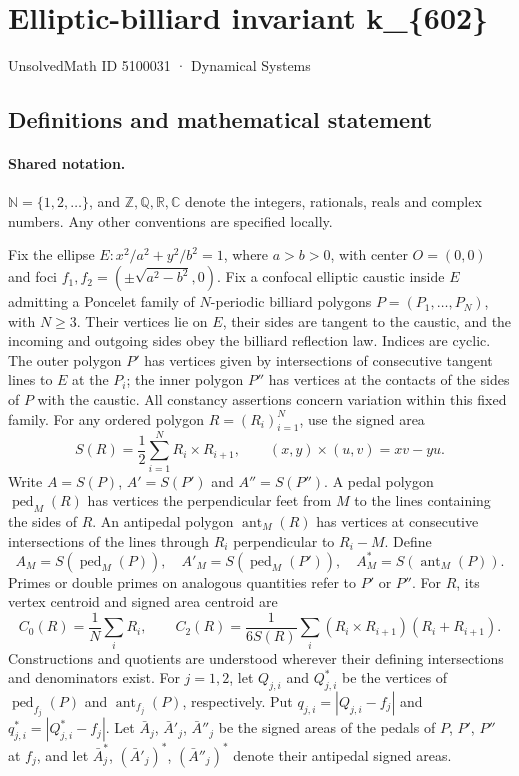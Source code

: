 \documentclass[11pt]{article}
\begin{document}
\setcounter{section}{5100030}
\section{Elliptic-billiard invariant k\_\{602\}}\label{5100031}
{\small\sffamily UnsolvedMath ID 5100031 · Dynamical Systems}
\subsection{Definitions and mathematical statement}

\paragraph{Shared notation.}$\mathbb N=\{1,2,\ldots\}$, and $\mathbb Z,\mathbb Q,\mathbb R,\mathbb C$ denote the integers, rationals, reals and complex numbers. Any other conventions are specified locally.


Fix the ellipse $E:x^2/a^2+y^2/b^2=1$, where $a>b>0$, with center $O=(0,0)$ and foci $f_1,f_2=(\pm\sqrt{a^2-b^2},0)$. Fix a confocal elliptic caustic inside $E$ admitting a Poncelet family of $N$-periodic billiard polygons $P=(P_1,\ldots,P_N)$, with $N\geq3$. Their vertices lie on $E$, their sides are tangent to the caustic, and the incoming and outgoing sides obey the billiard reflection law. Indices are cyclic. The outer polygon $P'$ has vertices given by intersections of consecutive tangent lines to $E$ at the $P_i$; the inner polygon $P''$ has vertices at the contacts of the sides of $P$ with the caustic. All constancy assertions concern variation within this fixed family.
For any ordered polygon $R=(R_i)_{i=1}^N$, use the signed area
\[S(R)=\frac12\sum_{i=1}^N R_i\times R_{i+1},\qquad (x,y)\times(u,v)=xv-yu.\]
Write $A=S(P)$, $A'=S(P')$ and $A''=S(P'')$. A pedal polygon $\operatorname{ped}_M(R)$ has vertices the perpendicular feet from $M$ to the lines containing the sides of $R$. An antipedal polygon $\operatorname{ant}_M(R)$ has vertices at consecutive intersections of the lines through $R_i$ perpendicular to $R_i-M$. Define
\[A_M=S(\operatorname{ped}_M(P)),\quad A'_M=S(\operatorname{ped}_M(P')),\quad A_M^*=S(\operatorname{ant}_M(P)).\]
Primes or double primes on analogous quantities refer to $P'$ or $P''$. For $R$, its vertex centroid and signed area centroid are
\[C_0(R)=\frac1N\sum_i R_i,\qquad C_2(R)=\frac{1}{6S(R)}\sum_i(R_i\times R_{i+1})(R_i+R_{i+1}).\]
Constructions and quotients are understood wherever their defining intersections and denominators exist.
For $j=1,2$, let $Q_{j,i}$ and $Q^*_{j,i}$ be the vertices of $\operatorname{ped}_{f_j}(P)$ and $\operatorname{ant}_{f_j}(P)$, respectively. Put $q_{j,i}=|Q_{j,i}-f_j|$ and $q^*_{j,i}=|Q^*_{j,i}-f_j|$. Let $\bar A_j$, $\bar A'_j$, $\bar A''_j$ be the signed areas of the pedals of $P$, $P'$, $P''$ at $f_j$, and let $\bar A_j^*$, $(\bar A'_j)^*$, $(\bar A''_j)^*$ denote their antipedal signed areas.
\end{document}
